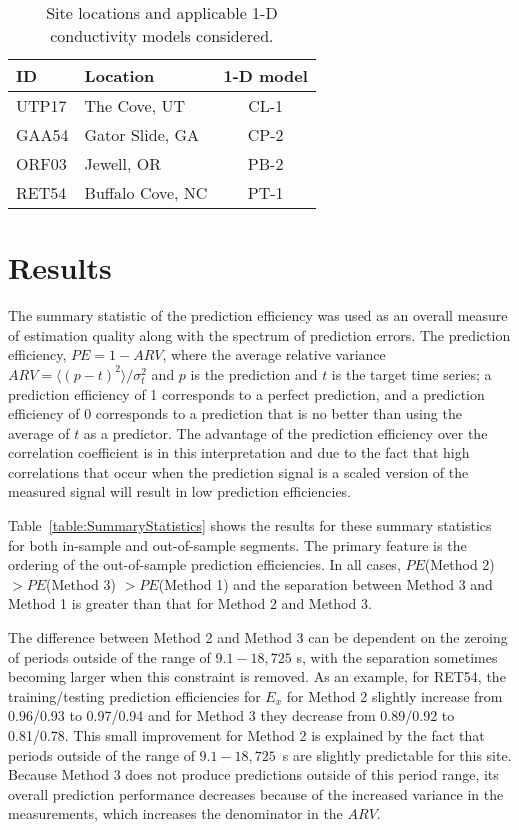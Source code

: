 \documentclass[linenumbers,draft]{agujournal}
\begin{document}
\begin{table}
\centering
\begin{tabular}{ l | l | c }
  ID    & Location & 1-D model \\
  \hline
  UTP17 & The Cove, UT & CL-1 \\
  GAA54 & Gator Slide, GA & CP-2 \\
  ORF03 & Jewell, OR & PB-2 \\
  RET54 & Buffalo Cove, NC & PT-1
\end{tabular}
\caption{Site locations and applicable 1-D conductivity models considered.}
\label{table:SiteLocations}
\end{table}

\section{Results}

The summary statistic of the prediction efficiency was used as an overall measure of estimation quality along with the spectrum of prediction errors.  The prediction efficiency, $PE = 1-ARV$, where the average relative variance $ARV = \langle(p-t)^2\rangle/\sigma_{t}^2$ and $p$ is the prediction and $t$ is the target time series; a prediction efficiency of 1 corresponds to a perfect prediction, and a prediction efficiency of 0 corresponds to a prediction that is no better than using the average of $t$ as a predictor.  The advantage of the prediction efficiency over the correlation coefficient is in this interpretation and due to the fact that high correlations that occur when the prediction signal is a scaled version of the measured signal will result in low prediction efficiencies.

Table~\ref{table:SummaryStatistics} shows the results for these summary statistics for both in-sample and out-of-sample segments.  The primary feature is the ordering of the out-of-sample prediction efficiencies.  In all cases, 
$PE$(Method 2) $> PE$(Method 3) $> PE$(Method 1) and the separation between Method 3 and Method 1 is greater than that for Method 2 and Method 3. 

The difference between Method 2 and Method 3 can be dependent on the zeroing of periods outside of the range of $9.1-18,725$ s, with the separation sometimes becoming larger when this constraint is removed.  As an example, for RET54, the training/testing prediction efficiencies for $E_x$ for Method 2 slightly increase from 0.96/0.93 to 0.97/0.94 and for Method 3 they decrease from 0.89/0.92 to 0.81/0.78.  This small improvement for Method 2 is explained by the fact that periods outside of the range of $9.1-18,725$~s are slightly predictable for this site.  Because Method 3 does not produce predictions outside of this period range, its overall prediction performance decreases because of the increased variance in the measurements, which increases the denominator in the $ARV$.
\end{document}

